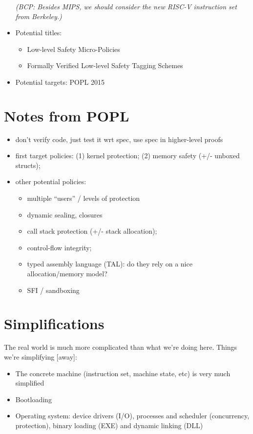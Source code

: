 \documentclass{article}
\newcommand{\bcp}[1]{{\color{blue}\em (BCP: #1)}}
\begin{document}
\begin{itemize}
\bcp{Besides MIPS, we should consider the new RISC-V instruction set from
  Berkeley.}
\item Potential titles:
  \begin{itemize}
  \item Low-level Safety Micro-Policies
  \item Formally Verified Low-level Safety Tagging Schemes
  \end{itemize}
\item Potential targets:
  POPL 2015
\end{itemize}

\section{Notes from POPL}

\begin{itemize}
\item don't verify code, just test it wrt spec, use spec in higher-level proofs
\item first target policies:
      (1) kernel protection;
      (2) memory safety (+/- unboxed structs);
\item other potential policies:
  \begin{itemize}
  \item multiple ``users'' / levels of protection
  \item dynamic sealing, closures
  \item call stack protection (+/- stack allocation);
  \item control-flow integrity;
  \item typed assembly language (TAL):
      do they rely on a nice allocation/memory model?
  \item SFI / sandboxing
  \end{itemize}
\end{itemize}

\section{Simplifications}

The real world is much more complicated than what we're doing here.
Things we're simplifying [away]:
\begin{itemize}
\item The concrete machine (instruction set, machine state, etc) is
  very much simplified
\item Bootloading
\item Operating system: device drivers (I/O),
      processes and scheduler (concurrency, protection),
      binary loading (EXE) and dynamic linking (DLL)
\end{itemize}
\end{document}
